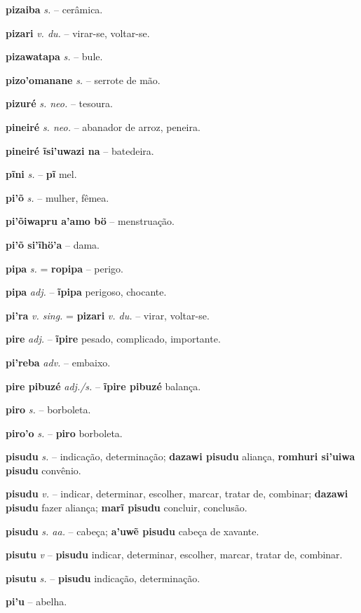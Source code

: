 \textbf{pizaiba} \textit{s.} -- cerâmica.

\textbf{pizari} \textit{v. du.} -- virar-se, voltar-se.

\textbf{pizawatapa} \textit{s.} -- bule.

\textbf{pizo'omanane} \textit{s.} -- serrote de mão.

\textbf{pizuré} \textit{s. neo.} -- tesoura.

\textbf{pineiré} \textit{s. neo.} -- abanador de arroz, peneira.

\textbf{pineiré ĩsi'uwazi na} -- batedeira.

\textbf{pĩni} \textit{s.} -- \textbf{pĩ} mel.

\textbf{pi'õ} \textit{s.} -- mulher, fêmea.

\textbf{pi'õiwapru a'amo bö} -- menstruação.

\textbf{pi'õ si'ĩhö'a} -- dama.

\textbf{pipa} \textit{s.} = \textbf{ropipa} -- perigo.

\textbf{pipa} \textit{adj.} -- \textbf{ĩpipa} perigoso, chocante.

\textbf{pi'ra} \textit{v. sing.} = \textbf{pizari} \textit{v. du.} -- virar, voltar-se.

\textbf{pire} \textit{adj.} -- \textbf{ĩpire} pesado, complicado, importante.

\textbf{pi'reba} \textit{adv.} -- embaixo.

\textbf{pire pibuzé} \textit{adj./s.} -- \textbf{ĩpire pibuzé} balança.

\textbf{piro} \textit{s.} -- borboleta.

\textbf{piro'o} \textit{s.} -- \textbf{piro} borboleta.

\textbf{pisudu} \textit{s.} -- indicação, determinação; \textbf{dazawi pisudu} aliança, \textbf{romhuri si'uiwa pisudu} convênio.

\textbf{pisudu} \textit{v.} -- indicar, determinar, escolher, marcar, tratar de, combinar; \textbf{dazawi pisudu} fazer aliança; \textbf{marĩ pisudu} concluir, conclusão.

\textbf{pisudu} \textit{s. aa.} -- cabeça; \textbf{a'uwẽ pisudu} cabeça de xavante.

\textbf{pisutu} \textit{v} -- \textbf{pisudu} indicar, determinar, escolher, marcar, tratar de, combinar.

\textbf{pisutu} \textit{s.} -- \textbf{pisudu} indicação, determinação.

\textbf{pi'u} -- abelha.

